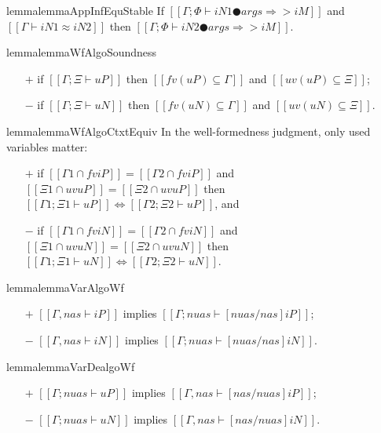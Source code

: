 \begin{restatable}{lemma}{lemmaAppInfEquStable}
    \label{lemma:app-inf-equ-stable}
    If $[[Γ; Φ ⊢ iN1 ● args ⇒> iM]]$ and $[[Γ ⊢ iN1 ≈ iN2]]$ 
    then $[[Γ; Φ ⊢ iN2 ● args ⇒> iM]]$.
\end{restatable}

\begin{restatable}{lemma}{lemmaWfAlgoSoundness}
        \label{lemma:wf-algo-soundness}
        \hfill
    \begin{itemize}
        \item[$+$] if $[[Γ ; Ξ ⊢ uP]]$ then $[[fv(uP) ⊆ Γ]]$ and $[[uv(uP) ⊆ Ξ]]$;
        \item[$-$] if $[[Γ ; Ξ ⊢ uN]]$ then $[[fv(uN) ⊆ Γ]]$ and $[[uv(uN) ⊆ Ξ]]$.
    \end{itemize}
\end{restatable}

\begin{restatable}{lemma}{lemmaWfAlgoCtxtEquiv}
    \label{lemma:wf-algo-ctxt-equiv}
    In the well-formedness judgment, only used variables matter:
    \begin{itemize}
    \item[$+$] if $[[Γ1 ∩ fv iP]] = [[Γ2 ∩ fv iP]]$
        and $[[Ξ1 ∩ uv uP]] = [[Ξ2 ∩ uv uP]]$ then
        $[[Γ1 ; Ξ1 ⊢ uP]] \iff [[Γ2 ; Ξ2 ⊢ uP]]$, and
    \item[$-$] if $[[Γ1 ∩ fv iN]] = [[Γ2 ∩ fv iN]]$
        and $[[Ξ1 ∩ uv uN]] = [[Ξ2 ∩ uv uN]]$ then
        $[[Γ1 ; Ξ1 ⊢ uN]] \iff [[Γ2 ; Ξ2 ⊢ uN]]$.
    \end{itemize}
\end{restatable}

\begin{restatable}{lemma}{lemmaVarAlgoWf}
    \label{lemma:var-algo-wf}
    \hfill
    \begin{itemize}
        \item[$+$]  $[[Γ, nas ⊢ iP]]$ implies $[[Γ; {nuas} ⊢ [nuas/nas]iP]]$;
        \item[$-$]  $[[Γ, nas ⊢ iN]]$ implies $[[Γ; {nuas} ⊢ [nuas/nas]iN]]$.
    \end{itemize}
\end{restatable}

\begin{restatable}{lemma}{lemmaVarDealgoWf}
    \label{lemma:var-dealgo-wf}
    \hfill
    \begin{itemize}
        \item[$+$]  $[[Γ; {nuas} ⊢ uP]]$ implies $[[Γ, nas ⊢ [nas/nuas]iP]]$;
        \item[$-$]  $[[Γ; {nuas} ⊢ uN]]$ implies $[[Γ, nas ⊢ [nas/nuas]iN]]$.
    \end{itemize}
\end{restatable}

